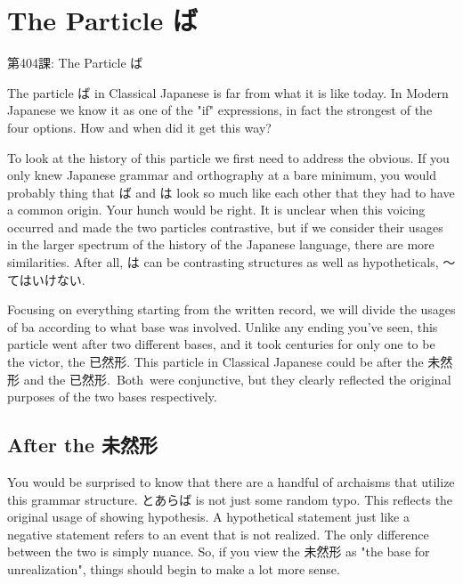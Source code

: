     
\chapter{The Particle ば}

\begin{center}
\begin{Large}
第404課: The Particle ば 
\end{Large}
\end{center}
 
\par{ The particle ば in Classical Japanese is far from what it is like today. In Modern Japanese we know it as one of the "if" expressions, in fact the strongest of the four options. How and when did it get this way? }

\par{ To look at the history of this particle we first need to address the obvious. If you only knew Japanese grammar and orthography at a bare minimum, you would probably thing that ば and は look so much like each other that they had to have a common origin. Your hunch would be right. It is unclear when this voicing occurred and made the two particles contrastive, but if we consider their usages in the larger spectrum of the history of the Japanese language, there are more similarities. After all, は can be contrasting structures as well as hypotheticals, ～てはいけない. }

\par{ Focusing on everything starting from the written record, we will divide the usages of ba according to what base was involved. Unlike any ending you've seen, this particle went after two different bases, and it took centuries for only one to be the victor, the 已然形. This particle in Classical Japanese could be after the 未然形 and the 已然形. Both were conjunctive, but they clearly reflected the original purposes of the two bases respectively. }
      
\section{After the 未然形}
 
\par{ You would be surprised to know that there are a handful of archaisms that utilize this grammar structure. とあらば is not just some random typo. This reflects the original usage of showing hypothesis. A hypothetical statement just like a negative statement refers to an event that is not realized. The only difference between the two is simply nuance. So, if you view the 未然形 as "the base for unrealization", things should begin to make a lot more sense. }


